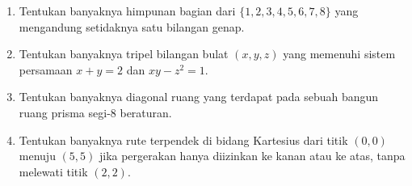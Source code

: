 \documentclass[12pt]{scrartcl}
\begin{document}
\begin{enumerate}
\item Tentukan banyaknya himpunan bagian dari $\{1, 2, 3, 4, 5, 6, 7, 8\}$ yang mengandung setidaknya satu bilangan genap.

\item Tentukan banyaknya tripel bilangan bulat $(x, y, z)$ yang memenuhi sistem persamaan $x + y = 2$ dan $xy - z^2 = 1$.

\item Tentukan banyaknya diagonal ruang yang terdapat pada sebuah bangun ruang prisma segi-8 beraturan.

\item Tentukan banyaknya rute terpendek di bidang Kartesius dari titik $(0,0)$ menuju $(5,5)$ jika pergerakan hanya diizinkan ke kanan atau ke atas, tanpa melewati titik $(2,2)$.
\end{enumerate}
\end{document}

